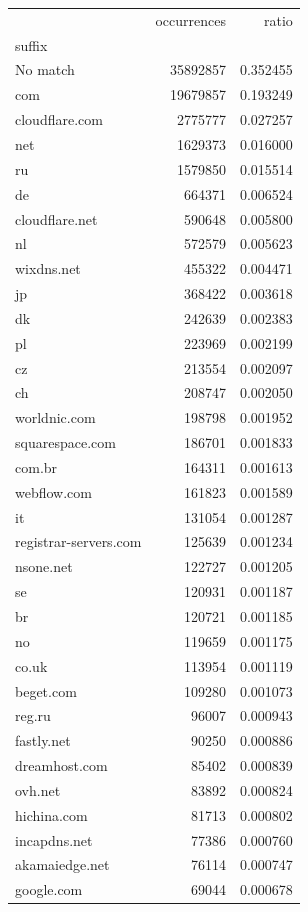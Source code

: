 \begin{tabular}{lrr}
\toprule
 & occurrences & ratio \\
suffix &  &  \\
\midrule
No match & 35892857 & 0.352455 \\
com & 19679857 & 0.193249 \\
cloudflare.com & 2775777 & 0.027257 \\
net & 1629373 & 0.016000 \\
ru & 1579850 & 0.015514 \\
de & 664371 & 0.006524 \\
cloudflare.net & 590648 & 0.005800 \\
nl & 572579 & 0.005623 \\
wixdns.net & 455322 & 0.004471 \\
jp & 368422 & 0.003618 \\
dk & 242639 & 0.002383 \\
pl & 223969 & 0.002199 \\
cz & 213554 & 0.002097 \\
ch & 208747 & 0.002050 \\
worldnic.com & 198798 & 0.001952 \\
squarespace.com & 186701 & 0.001833 \\
com.br & 164311 & 0.001613 \\
webflow.com & 161823 & 0.001589 \\
it & 131054 & 0.001287 \\
registrar-servers.com & 125639 & 0.001234 \\
nsone.net & 122727 & 0.001205 \\
se & 120931 & 0.001187 \\
br & 120721 & 0.001185 \\
no & 119659 & 0.001175 \\
co.uk & 113954 & 0.001119 \\
beget.com & 109280 & 0.001073 \\
reg.ru & 96007 & 0.000943 \\
fastly.net & 90250 & 0.000886 \\
dreamhost.com & 85402 & 0.000839 \\
ovh.net & 83892 & 0.000824 \\
hichina.com & 81713 & 0.000802 \\
incapdns.net & 77386 & 0.000760 \\
akamaiedge.net & 76114 & 0.000747 \\
google.com & 69044 & 0.000678 \\

\end{tabular}
